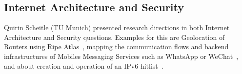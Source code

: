 \subsection{Internet Architecture and Security}

Quirin Scheitle (TU Munich) presented research directions in both Internet
Architecture and Security questions.  Examples for this are Geolocation of
Routers using Ripe Atlas~\cite{glra}, mapping the communication flows and
backend infrastructures of Mobiles Messaging Services such as WhatsApp or
WeChat~\cite{mms}, and about creation and operation of an IPv6
hitlist~\cite{ipv6hitlist}.

